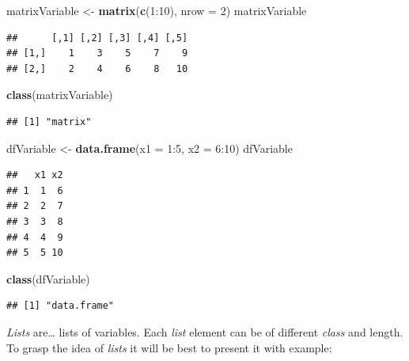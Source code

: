 \documentclass[]{book}
\newenvironment{Shaded}{\begin{snugshade}}{\end{snugshade}}
\newcommand{\KeywordTok}[1]{\textcolor[rgb]{0.12,0.11,0.11}{\textbf{#1}}}
\newcommand{\DataTypeTok}[1]{\textcolor[rgb]{0.00,0.34,0.68}{#1}}
\newcommand{\DecValTok}[1]{\textcolor[rgb]{0.69,0.50,0.00}{#1}}
\newcommand{\StringTok}[1]{\textcolor[rgb]{0.75,0.01,0.01}{#1}}
\newcommand{\OperatorTok}[1]{\textcolor[rgb]{0.12,0.11,0.11}{#1}}
\newcommand{\NormalTok}[1]{\textcolor[rgb]{0.12,0.11,0.11}{#1}}
\theoremstyle{definition}
\theoremstyle{definition}
\theoremstyle{definition}
\theoremstyle{remark}
\begin{document}
\begin{Shaded}
\begin{Highlighting}[]
\NormalTok{matrixVariable <-}\StringTok{ }\KeywordTok{matrix}\NormalTok{(}\KeywordTok{c}\NormalTok{(}\DecValTok{1}\OperatorTok{:}\DecValTok{10}\NormalTok{), }\DataTypeTok{nrow =} \DecValTok{2}\NormalTok{)}
\NormalTok{matrixVariable}
\end{Highlighting}
\end{Shaded}

\begin{verbatim}
##      [,1] [,2] [,3] [,4] [,5]
## [1,]    1    3    5    7    9
## [2,]    2    4    6    8   10
\end{verbatim}

\begin{Shaded}
\begin{Highlighting}[]
\KeywordTok{class}\NormalTok{(matrixVariable)}
\end{Highlighting}
\end{Shaded}

\begin{verbatim}
## [1] "matrix"
\end{verbatim}

\begin{Shaded}
\begin{Highlighting}[]
\NormalTok{dfVariable <-}\StringTok{ }\KeywordTok{data.frame}\NormalTok{(}\DataTypeTok{x1 =} \DecValTok{1}\OperatorTok{:}\DecValTok{5}\NormalTok{, }\DataTypeTok{x2 =} \DecValTok{6}\OperatorTok{:}\DecValTok{10}\NormalTok{)}
\NormalTok{dfVariable}
\end{Highlighting}
\end{Shaded}

\begin{verbatim}
##   x1 x2
## 1  1  6
## 2  2  7
## 3  3  8
## 4  4  9
## 5  5 10
\end{verbatim}

\begin{Shaded}
\begin{Highlighting}[]
\KeywordTok{class}\NormalTok{(dfVariable)}
\end{Highlighting}
\end{Shaded}

\begin{verbatim}
## [1] "data.frame"
\end{verbatim}

\emph{Lists} are\ldots{} lists of variables. Each \emph{list} element
can be of different \emph{class} and length. To grasp the idea of
\emph{lists} it will be best to present it with example:
\end{document}
